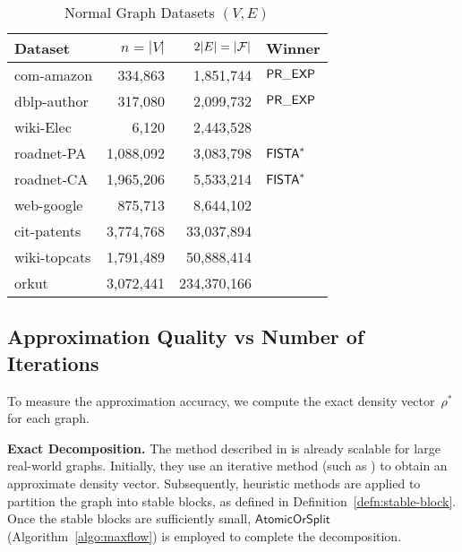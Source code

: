 

\begin{table}[ht]
	\centering
	\caption{Normal Graph Datasets $(V, E)$}
	\label{tab:dataset} %
	\begin{tabular}{|l|r|r|l|}
		\hline
		Dataset & $n = |V|$ & $2 |E| = |\mathcal {F}|$ & Winner\\
		\hline
		com-amazon & 334,863 & 1,851,744 & $\mathsf{PR\_EXP}$\\
		\hline
		dblp-author & 317,080 & 2,099,732 & $\mathsf{PR\_EXP}$\\
		\hline
		wiki-Elec & ~6,120 & 2,443,528  & \prexp \\
		\hline
		roadnet-PA & 1,088,092 & 3,083,798 & $\mathsf{FISTA}^*$\\
		\hline
		roadnet-CA & 1,965,206 & 5,533,214 & $\mathsf{FISTA}^*$ \\
		\hline
		web-google & 875,713 & 8,644,102 & \prexp \\
		\hline
		cit-patents & 3,774,768 & 33,037,894 & \prexp \\
		\hline
		wiki-topcats & 1,791,489 & 50,888,414 & \prexp\\
		\hline
		orkut & 3,072,441 & 234,370,166  & \prexp \\
		\hline
	\end{tabular}
\end{table}

	


\subsection{Approximation Quality vs Number of Iterations}

To measure the approximation accuracy,
we compute the exact density vector~$\rho^*$
for each graph.

\noindent \textbf{Exact Decomposition.}
The method described in \cite{DBLP:conf/www/DanischCS17} is already scalable for large real-world graphs. Initially, they use an iterative method (such as \elist) to obtain an approximate density vector. Subsequently, heuristic methods are applied to partition the graph into stable blocks, as defined in Definition~\ref{defn:stable-block}. Once the stable blocks are sufficiently small, $\mathsf{AtomicOrSplit}$ (Algorithm~\ref{algo:maxflow}) is employed to complete the decomposition.

